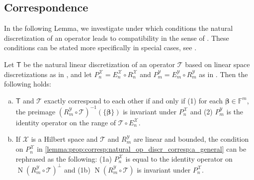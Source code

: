 \documentclass[a4paper]{paper}
\newcommand*{\SPC}[1]{{\ensuremath{\mathscr{#1}}}}
\newcommand*{\SPCX}{\SPC{X}}
\newcommand*{\SPCY}{\SPC{Y}}
\newcommand*{\FIELD}{{\ensuremath{\mathbb{F}}}}
\newcommand*{\Fm}{{\ensuremath{\FIELD^m}}}
\newcommand*{\OP}[1]{{\ensuremath{\mathcal{#1}}}}
\newcommand*{\OPT}{\OP{T}}
\newcommand{\DISCOP}[1]{{\ensuremath{\mathsf{#1}}}}
\newcommand*{\DISCOPT}{\DISCOP{T}}
\newcommand*{\EXT}[2]{\ensuremath{E_{#1}^{#2}}}
\newcommand*{\REST}[2]{\ensuremath{R_{#1}^{#2}}}
\newcommand*{\PROJ}[2]{\ensuremath{P_{#1}^{#2}}}
\newcommand*{\RnX}{{\ensuremath{\REST{n}{\SPC{X}}}}}
\newcommand*{\RmY}{{\ensuremath{\REST{m}{\SPC{Y}}}}}
\newcommand*{\EnX}{{\ensuremath{\EXT{n}{\SPC{X}}}}}
\newcommand*{\EmY}{{\ensuremath{\EXT{m}{\SPC{Y}}}}}
\newcommand*{\PnX}{{\ensuremath{\PROJ{n}{\SPCX}}}}
\newcommand*{\PmY}{{\ensuremath{\PROJ{m}{\SPCY}}}}
\DeclareMathOperator{\NULL}{{N}}
\newcommand*{\BDbeta}{\boldsymbol{\beta}}
\begin{document}
\subsection{Correspondence}
\label{subsec:prop:corresp}

In the following Lemma, we investigate under which conditions the natural discretization of an operator leads to 
compatibility in the sense of . These conditions can be stated more 
specifically in special cases, see .


\begin{lemma}
 \label{lemma:prop:corresp:natural_op_discr_corresp}
 Let $\DISCOPT$ be the natural linear discretization of an operator $\OPT$ based on linear space discretizations as 
 in , and let $\PnX = \EnX \circ \RnX$ and $\PmY = \EmY \circ \RmY$ as in 
 . Then the following holds:
 
 \begin{enumerate}[(a)]
  \item \label{lemma:prop:corresp:natural_op_discr_corresp:a_general}
  $\DISCOPT$ and $\OPT$ exactly correspond to each other if and only if (1) for each $\BDbeta \in \Fm$, the 
  preimage $(\RmY \circ \OPT)^{-1}(\{\BDbeta\})$ is invariant under $\PnX$ and (2) $\PmY$ is the identity operator on 
  the range of $\OPT \circ \EnX$.

  \item \label{lemma:prop:corresp:natural_op_discr_corresp:b_hilbert_linear}
  If $\SPCX$ is a Hilbert space and $\OPT$ and $\RmY$ are linear and bounded, the condition on $\PnX$ in 
  \eqref{lemma:prop:corresp:natural_op_discr_corresp:a_general} can be rephrased as the following: 
  (1a) $\PnX$ is equal to the identity operator on $\NULL(\RmY \circ \OPT)^\perp$ and (1b) 
  $\NULL(\RmY \circ \OPT)$ is invariant under $\PnX$.
  
 \end{enumerate}
\end{lemma}
\vspace{1em}
\end{document}
